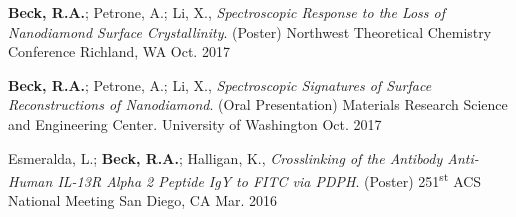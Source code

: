 \begin{cvpresentations}
\cvpresentation
{\textbf{Beck, R.A.}; Petrone, A.; Li, X., \textit{Spectroscopic Response to the Loss of Nanodiamond Surface Crystallinity}. (Poster) Northwest Theoretical Chemistry Conference}
{Richland, WA} %
{Oct. 2017} %


\cvpresentation
{\textbf{Beck, R.A.}; Petrone, A.; Li, X., \textit{Spectroscopic Signatures of Surface Reconstructions of Nanodiamond}. (Oral Presentation) Materials Research Science and Engineering Center.}
{University of Washington} %
{Oct. 2017} %




\cvpresentation
{Esmeralda, L.; \textbf{Beck, R.A.}; Halligan, K., \textit{Crosslinking of the Antibody Anti-Human IL-13R Alpha 2 Peptide IgY to FITC via PDPH}. (Poster) 251\textsuperscript{st} ACS National Meeting}
{San Diego, CA} %
{Mar. 2016} %


\end{cvpresentations}

